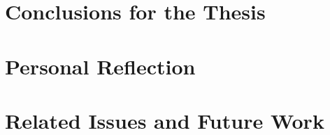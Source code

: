 \section{Conclusions for the Thesis}
\label{conclusions:thesis}


\section{Personal Reflection}
\label{conclusions:reflection}


\section{Related Issues and Future Work}
\label{conclusions:future}
